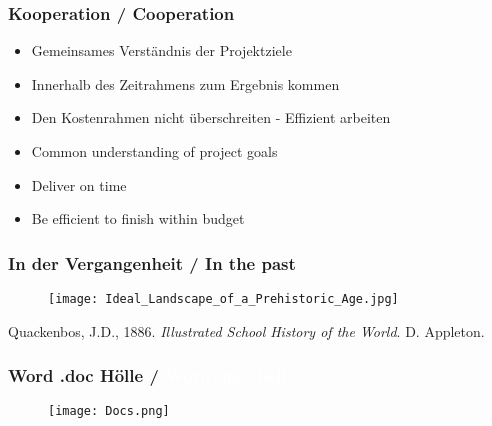 \documentclass{beamer}
\begin{document}
\begin{frame}
  \frametitle{Kooperation / \textcolor{mfn_green}{Cooperation}}

  \begin{itemize}
  \item{Gemeinsames Verständnis der Projektziele}
  \item{Innerhalb des Zeitrahmens zum Ergebnis kommen}
  \item{Den Kostenrahmen nicht überschreiten - Effizient arbeiten}
  \end{itemize}
  
  \begin{itemize}
  \item{\textcolor{mfn_green}{Common understanding of project goals}}
  \item{\textcolor{mfn_green}{Deliver on time}}
  \item{\textcolor{mfn_green}{Be efficient to finish within budget}}
  \end{itemize}
\end{frame}

%
%
\begin{frame}
  \frametitle{In der Vergangenheit / \textcolor{mfn_green}{In the past}}
  \begin{figure}
    \texttt{[image: Ideal\_Landscape\_of\_a\_Prehistoric\_Age.jpg]}
  \end{figure}
  \begin{center}{\tiny Quackenbos, J.D., 1886. \textit{Illustrated School History of the World}. D. Appleton.}\end{center}
\end{frame}

{
\begin{frame}
  \frametitle{Word\textsuperscript{\tiny\textregistered} .doc Hölle /
    \textcolor{white}{Word\textsuperscript{\tiny\textregistered} .doc hell}}
  \begin{figure}
  \texttt{[image: Docs.png]}
  \end{figure}
\end{frame}
}
\end{document}
